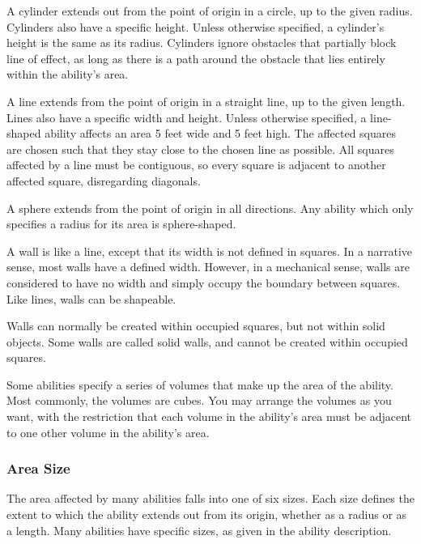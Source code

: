              A cylinder extends out from the point of origin in a circle, up to the given radius.
            Cylinders also have a specific height.
            Unless otherwise specified, a cylinder's height is the same as its radius.
            Cylinders ignore obstacles that partially block line of effect, as long as there is a path around the obstacle that lies entirely within the ability's area.

             A line extends from the point of origin in a straight line, up to the given length.
            Lines also have a specific width and height.
            Unless otherwise specified, a line-shaped ability affects an area 5 feet wide and 5 feet high.
            The affected squares are chosen such that they stay close to the chosen line as possible.
            All squares affected by a line must be contiguous, so every square is adjacent to another affected square, disregarding diagonals.

             A sphere extends from the point of origin in all directions.
            Any ability which only specifies a radius for its area is sphere-shaped.

             A wall is like a line, except that its width is not defined in squares.
            In a narrative sense, most walls have a defined width.
            However, in a mechanical sense, walls are considered to have no width and simply occupy the boundary between squares.
            Like lines, walls can be shapeable.

            Walls can normally be created within occupied squares, but not within solid objects.
            Some walls are called solid walls, and cannot be created within occupied squares.

             Some abilities specify a series of volumes that make up the area of the ability.
            Most commonly, the volumes are cubes.
            You may arrange the volumes as you want, with the restriction that each volume in the ability's area must be adjacent to one other volume in the ability's area.

        \subsubsection{Area Size}

            The area affected by many abilities falls into one of six sizes.
            Each size defines the extent to which the ability extends out from its origin, whether as a radius or as a length.
            Many abilities have specific sizes, as given in the ability description.

